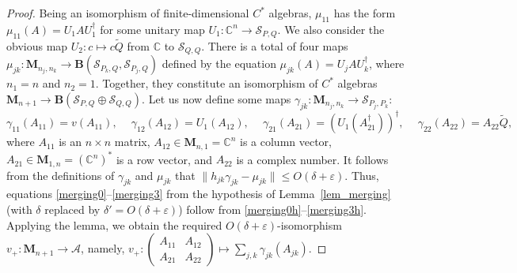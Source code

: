\documentclass[12pt]{article}
\newcommand{\CC}{\mathbb{C}}
\newcommand{\calA}{\mathcal{A}}
\newcommand{\calS}{\mathcal{S}}
\newcommand{\Bo}{\mathbf{B}}
\newcommand{\wt}{\widetilde}
\newcommand*{\Ma}[1]{\mathbf{M}_{#1}}
\newcommand{\eps}{\varepsilon}
\renewcommand{\le}{\leqslant}
\newtheorem[definition]{Definition}[Theorem]{Definition}
\newtheorem[remark]{Example}[Theorem]{Example}
\newtheorem[remark]{Remark}[Theorem]{Remark}
\newtheorem[remark]{Question}[Theorem]{Open question}
\newtheorem*[definition]{definition}{Definition}
\newtheorem*[remark]{example}{Example}
\newtheorem*[remark]{remark}{Remark}
\newtheorem*[remark]{question}{Open question}
\numberwithin{equation}{section}
\begin{document}
\begin{proof}
Being an isomorphism of finite-dimensional $C^*$ algebras, $\mu_{11}$ has the form $\mu_{11}(A)=U_1AU_1^\dag$ for some unitary map $U_1\colon\CC^n\to\calS_{P,Q}$. We also consider the obvious map $U_2\colon c\mapsto c\wt{Q}$ from $\CC$ to $\calS_{Q,Q}$. There is a total of four maps $\mu_{jk}\colon\Ma{n_j,n_k} \to\Bo(\calS_{P_k,Q},\calS_{P_j,Q})$ defined by the equation $\mu_{jk}(A)=U_jAU_k^\dag$, where $n_1=n$ and $n_2=1$. Together, they constitute an isomorphism of $C^*$ algebras $\Ma{n+1}\to\Bo(\calS_{P,Q}\oplus\calS_{Q,Q})$. Let us now define some maps $\gamma_{jk}\colon\Ma{n_j,n_k}\to\calS_{P_j,P_k}$:
\begin{equation}
\gamma_{11}(A_{11})=v(A_{11}),\quad\:
\gamma_{12}(A_{12})= U_1(A_{12}),\quad\:
\gamma_{21}(A_{21})=(U_1(A_{21}^\dag))^\dag,\quad\:
\gamma_{22}(A_{22})=A_{22}\wt{Q},
\end{equation}
where $A_{11}$ is an $n\times n$ matrix, $A_{12}\in\Ma{n,1}=\CC^n$ is a column vector, $A_{21}\in\Ma{1,n}=(\CC^n)^*$ is a row vector, and $A_{22}$ is a complex number. It follows from the definitions of $\gamma_{jk}$ and $\mu_{jk}$ that $\|h_{jk}\gamma_{jk}-\mu_{jk}\|\le O(\delta+\eps)$. Thus, equations \eqref{merging0}--\eqref{merging3} from the hypothesis of Lemma~\ref{lem_merging} (with $\delta$ replaced by $\delta'=O(\delta+\eps)$) follow from \eqref{merging0h}--\eqref{merging3h}. Applying the lemma, we obtain the required $O(\delta+\eps)$-isomorphism $v_+\colon\Ma{n+1}\to\calA$, namely, $v_+\colon\left(\begin{smallmatrix}A_{11} & A_{12}\\ A_{21} & A_{22}\end{smallmatrix}\right) \mapsto\sum_{j,k}\gamma_{jk}(A_{jk})$.
\end{proof}
\end{document}
